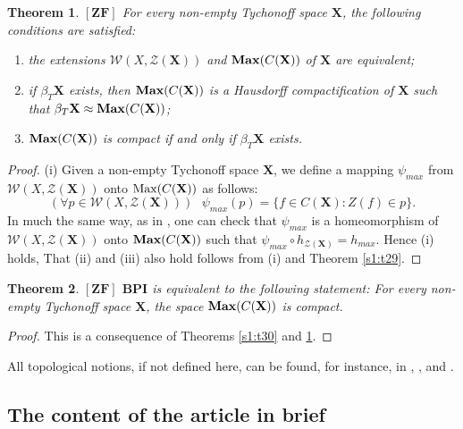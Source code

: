 \documentclass[12pt,twoside,leqno]{article}
\theoremstyle{plain}
\newtheorem{theorem}{Theorem}[section]
\theoremstyle{definition}
\theoremstyle{remark}
\DeclareMathOperator{\Max}{{\rm Max}}
\DeclareMathOperator{\BMax}{\bf{Max}}
\begin{document}
\begin{theorem}
	\label{s1:t34}
	$[\mathbf{ZF}]$
	For every non-empty Tychonoff space $\mathbf{X}$, the following conditions are satisfied:
	\begin{enumerate}
		\item[(i)] the extensions $\mathcal{W}(X, \mathcal{Z}(\mathbf{X}))$ and $\BMax(C(\mathbf{X}))$ of $\mathbf{X}$ are equivalent;
		\item[(ii)] if $\beta_T\mathbf{X}$ exists, then $\BMax(C(\mathbf{X}))$ is a Hausdorff compactification of $\mathbf{X}$ such that $\beta_T\mathbf{X}\approx \BMax(C(\mathbf{X}))$;
		\item[(iii)] $\BMax(C(\mathbf{X}))$ is compact if and only if $\beta_T\mathbf{X}$ exists.
	\end{enumerate}
\end{theorem}
\begin{proof}
	(i) Given a non-empty Tychonoff space $\mathbf{X}$, we define a mapping $\psi_{max}$ from $\mathcal{W}(X,\mathcal{Z}(\mathbf{X}))$ onto $\Max(C(\mathbf{X}))$ as follows:
	$$(\forall p\in\mathcal{W}(X, \mathcal{Z}(\mathbf{X}))) \text{ }  \psi_{max}(p)=\{f\in C(\mathbf{X}): Z(f)\in p\}.$$
	In much the same way, as in \cite[Chapter 7.11]{gj}, one can check that $\psi_{max}$ is a homeomorphism of $\mathcal{W}(X,\mathcal{Z}(\mathbf{X}))$ onto $\BMax(C(\mathbf{X}))$ such that $\psi_{max}\circ h_{\mathcal{Z}(\mathbf{X})}=h_{max}$. Hence (i) holds, That (ii) and (iii) also hold follows from (i) and Theorem \ref{s1:t29}.
\end{proof}

\begin{theorem}
	\label{s1:t35}
	$[\mathbf{ZF}]$ $\mathbf{BPI}$ is equivalent to the following statement: For every non-empty Tychonoff space $\mathbf{X}$, the space $\BMax(C(\mathbf{X}))$ is compact.
\end{theorem}
\begin{proof}
	This is a consequence of Theorems \ref{s1:t30} and \ref{s1:t34}.
\end{proof}

All topological notions, if not defined here, can be found, for instance, in \cite{en}, \cite{gj}, \cite{nag} and \cite{w}.
\subsection{The content of the article in brief} 
\label{s1.6}
\end{document}
